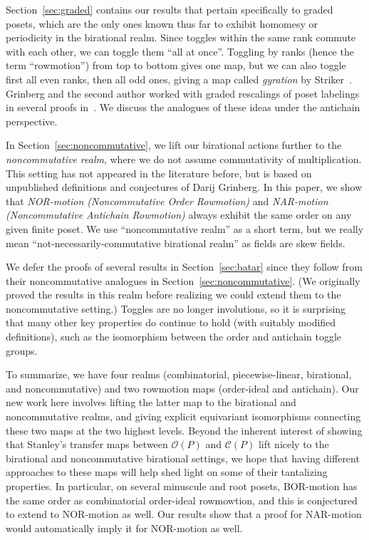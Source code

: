 \documentclass[ALCO,ThmDefs,Unicode,epreuves]{cedram}
\newcommand{\calc}{\mathcal{C}}
\newcommand{\calo}{\mathcal{O}}
\begin{document}
Section~\ref{sec:graded} contains our results that pertain specifically to graded
posets, which are the only ones known thus far to exhibit homomesy or periodicity in the birational realm. 
Since toggles within the same rank commute with each other, we can toggle them ``all at
once''. Toggling by ranks (hence the term ``rowmotion'') from top to bottom gives one map,
but we can also toggle first all even ranks, then all odd ones, giving a map
called \textit{gyration} by Striker~\cite{strikerRS}. 
Grinberg and the second author worked with graded rescalings of
poset labelings in several proofs in~\cite{GrRo15,GrRo16}.
We discuss the analogues of these ideas under the antichain perspective.

In Section~\ref{sec:noncommutative}, we lift our birational actions
further to the \emph{noncommutative realm}, where we do not assume commutativity
of multiplication. This setting has not appeared in the literature before, but is based on
unpublished definitions and conjectures of Darij Grinberg. 
In this paper, we show that \emph{NOR-motion (Noncommutative Order Rowmotion)} and
\emph{NAR-motion (Noncommutative Antichain Rowmotion)} 
always exhibit the same order on any given finite poset.
We use ``noncommutative realm'' as a short term, but we really mean
``not-necessarily-commutative birational realm'' as fields are skew fields. 

We defer the proofs of several results in Section~\ref{sec:batar} since they follow from their
noncommutative analogues in Section~\ref{sec:noncommutative}. 
(We originally proved the results in this realm before realizing we could extend
them to the noncommutative setting.) 
Toggles are no longer involutions, so it is surprising that many other key properties do continue to hold
(with suitably modified definitions), such as
the isomorphism between the order and antichain toggle groups. 

To summarize, we have four realms (combinatorial, piecewise-linear, birational, and
noncommutative) and two rowmotion maps (order-ideal and antichain). Our new work here
involves lifting the latter map to the birational and noncommutative realms, and giving
explicit equivariant isomorphisms connecting these two maps at the two highest levels. 
Beyond the inherent interest of showing that Stanley's transfer maps between $\calo (P)$ and
$\calc (P)$ lift nicely to the birational and noncommutative birational settings, we hope
that having different approaches to these maps will help shed light on some of their
tantalizing properties. In particular, on several minuscule and root posets, BOR-motion has
the same order as combinatorial
order-ideal rowmowtion, and this is conjectured to extend to NOR-motion as well. Our
results show that a proof for NAR-motion would automatically imply it for NOR-motion as
well. 
\end{document}

